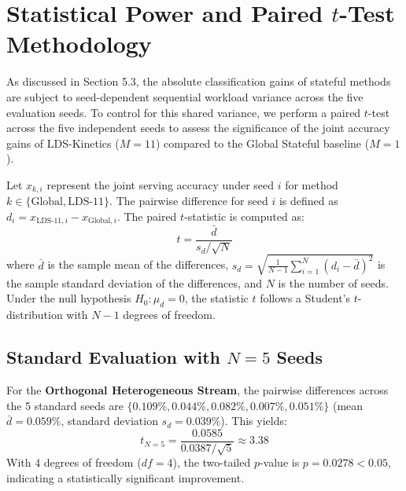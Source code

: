 \documentclass{article}
\theoremstyle{plain}
\theoremstyle{definition}
\theoremstyle{remark}
\begin{document}










\newpage
\appendix
\onecolumn

\section{Statistical Power and Paired $t$-Test Methodology}
\label{app:statistical_power}
As discussed in Section 5.3, the absolute classification gains of stateful methods are subject to seed-dependent sequential workload variance across the five evaluation seeds. To control for this shared variance, we perform a paired $t$-test across the five independent seeds to assess the significance of the joint accuracy gains of LDS-Kinetics ($M=11$) compared to the Global Stateful baseline ($M=1$).

Let $x_{k, i}$ represent the joint serving accuracy under seed $i$ for method $k \in \{\text{Global}, \text{LDS-11}\}$. The pairwise difference for seed $i$ is defined as $d_i = x_{\text{LDS-11}, i} - x_{\text{Global}, i}$. The paired $t$-statistic is computed as:
\begin{equation}
    t = \frac{\bar{d}}{s_d / \sqrt{N}}
\end{equation}
where $\bar{d}$ is the sample mean of the differences, $s_d = \sqrt{\frac{1}{N-1} \sum_{i=1}^N (d_i - \bar{d})^2}$ is the sample standard deviation of the differences, and $N$ is the number of seeds.
Under the null hypothesis $H_0: \mu_d = 0$, the statistic $t$ follows a Student's $t$-distribution with $N-1$ degrees of freedom.

\subsection{Standard Evaluation with $N=5$ Seeds}
For the \textbf{Orthogonal Heterogeneous Stream}, the pairwise differences across the 5 standard seeds are $\{0.109\%, 0.044\%, 0.082\%, 0.007\%, 0.051\%\}$ (mean $\bar{d} = 0.059\%$, standard deviation $s_d = 0.039\%$). This yields:
\begin{equation}
    t_{N=5} = \frac{0.0585}{0.0387 / \sqrt{5}} \approx 3.38
\end{equation}
With 4 degrees of freedom ($df=4$), the two-tailed $p$-value is $p = 0.0278 < 0.05$, indicating a statistically significant improvement.
\end{document}
